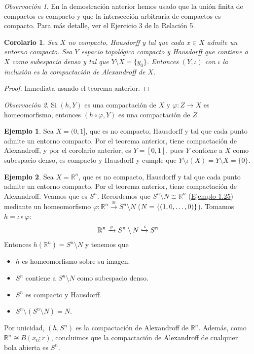 \documentclass[12pt]{report}
\newtheorem{corollary}{Corolario}[chapter]
\theoremstyle{definition}
\theoremstyle{definition}
\newtheorem{example}{Ejemplo}[chapter]
\theoremstyle{remark}
\newtheorem*{obs}{Observación} %
\newcommand{\R}{\mathbb R}
\begin{document}
\begin{obs}
En la demostración anterior hemos usado que la unión finita de compactos es compacto y que la intersección arbitraria de compactos es compacto. Para más detalle, ver el Ejercicio 3 de la Relación 5.
\end{obs}

\begin{corollary}
Sea $X$ no compacto, Hausdorff y tal que cada $x \in X$ admite un entorno compacto. Sea $Y$ espacio topológico compacto y Hausdorff que contiene a $X$ como subespacio denso y tal que $Y \setminus X = \{y_0\}$. Entonces $(Y,\iota)$ con $\iota$ la inclusión es la compactación de Alexandroff de $X$.
\end{corollary}

\begin{proof}
Inmediata usando el teorema anterior.
\end{proof}

\begin{obs}
Si $(h,Y)$ es una compactación de $X$ y $\varphi \colon Z \to X$ es homeomorfismo, entonces $(h \circ \varphi, Y)$ es una compactación de $Z$.
\end{obs}

\begin{example}
Sea $X = (0,1]$, que es no compacto, Hausdorff y tal que cada punto admite un entorno compacto. Por el teorema anterior, tiene compactación de Alexandroff, y por el corolario anterior, es $Y = [0,1]$, pues $Y$ contiene a $X$ como subespacio denso, es compacto y Hausdorff y cumple que $Y \setminus \iota(X) = Y \setminus X = \{0\}$.
\end{example}

\begin{example}
Sea $X = \R^n$, que es no compacto, Hausdorff y tal que cada punto admite un entorno compacto. Por el teorema anterior, tiene compactación de Alexandroff. Veamos que es $S^n$. Recordemos que $S^n \setminus N \cong \R^n$ (\hyperref[ex1.25.]{\color{blue}Ejemplo 1.25}) mediante un homeomorfismo $\varphi \colon \R^n \xrightarrow{\cong} S^n \setminus N$ ($N = \{(1,0,\mathellipsis,0)\}$). Tomamos $h = \iota \circ \varphi$:
\[\R^n \xrightarrow{\varphi} S^n \setminus N \xhookrightarrow{\iota} S^n\]
Entonces $h(\R^n) = S^n \setminus N$ y tenemos que
\begin{itemize}
    \item $h$ es homeomorfismo sobre su imagen.
    \item $S^n$ contiene a $S^n \setminus N$ como subespacio denso.
    \item $S^n$ es compacto y Hausdorff.
    \item $S^n \setminus (S^n \setminus N) = N$.
\end{itemize}
Por unicidad, $(h,S^n)$ es la compactación de Alexandroff de $\R^n$. Además, como $\R^n \cong B(x_0;r)$, concluimos que la compactación de Alexandroff de cualquier bola abierta es $S^n$.
\end{example}
\end{document}
